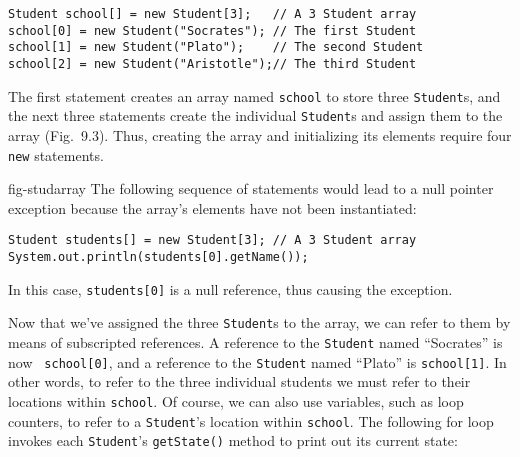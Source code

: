 \begin{jjjlisting}
\begin{lstlisting}
Student school[] = new Student[3];   // A 3 Student array
school[0] = new Student("Socrates"); // The first Student
school[1] = new Student("Plato");    // The second Student
school[2] = new Student("Aristotle");// The third Student
\end{lstlisting}
\end{jjjlisting}

\noindent The first statement creates an array named {\tt school}
to store three \mbox{\tt Student}s, and the next three statements create
the individual {\tt Student}s and assign them to the array
(Fig.~9.3).  Thus, creating the array and initializing
its elements require four {\tt new} statements.

{fig-studarray}
The following sequence of statements would lead to a null pointer
exception because the array's elements have not been instantiated:

\begin{jjjlisting}
\begin{lstlisting}
Student students[] = new Student[3]; // A 3 Student array
System.out.println(students[0].getName());
\end{lstlisting}
\end{jjjlisting}

\noindent In this case, {\tt students[0]} is a null reference, thus
causing the exception.


\noindent Now that we've assigned the three {\tt Student}s to
the array, we can refer to them by means of subscripted references.  A
reference to the \mbox{\tt Student} named ``Socrates'' is now {\tt
school[0]}, and a reference to the \mbox{\tt Student} named ``Plato''
is {\tt school[1]}. In other words, to refer to the three individual
students we must refer to their locations within {\tt school}. Of
course, we can also use variables, such as loop counters, to refer to
a {\tt Student}'s location within {\tt school}. The following for loop
invokes each {\tt Student}'s {\tt getState()} method to print out its
current state:

